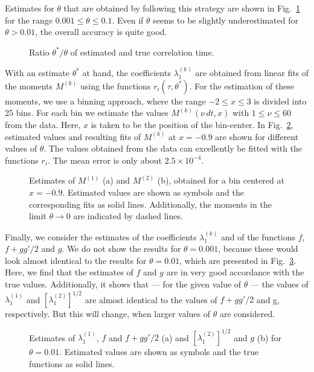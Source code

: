 \documentclass[aps,twocolumn,superscriptaddress,showpacs,showkeys]{revtex4}
\begin{document}
Estimates for $\theta$ that are obtained by following this strategy are shown in Fig.~\ref{fig3} for the range
$0.001\le\theta\le 0.1$. Even if $\theta$ seems to be slightly underestimated for $\theta>0.01$, the overall accuracy
is quite good.
%
\begin{figure}[h]
  \caption{\protect Ratio $\theta^*/\theta$ of estimated and true correlation time.
  }\label{fig3}
\end{figure}

With an estimate $\theta^*$ at hand, the coefficients $\lambda_1^{(k)}$ are obtained from linear fits
of the moments $M^{(k)}$ using the functions $r_i(\tau,\theta^*)$. For the estimation of these moments, we use a binning
approach, where the range $-2\le x\le 3$ is divided into 25 bins. For each bin we estimate the values $M^{(k)}(\nu\, dt,x)$
with $1\le\nu\le 60$ from the data. Here, $x$ is taken to be the position of the bin-center. In Fig.~\ref{fig4}, estimated
values and resulting fits of $M^{(k)}$ at $x=-0.9$ are shown for different values of $\theta$. The values obtained from
the data can excellently be fitted with the functions $r_i$. The mean error is only about $2.5\times 10^{-4}$.
%
\begin{figure}[h]
  \caption{\protect Estimates of $M^{(1)}$ (a) and $M^{(2)}$ (b), obtained for a bin centered at $x=-0.9$. Estimated 
           values are shown as symbols and the corresponding fits as solid lines. Additionally, the moments in the limit
           $\theta\to 0$ are indicated by dashed lines.
  }\label{fig4}
\end{figure}

Finally, we consider the estimates of the coefficients $\lambda_1^{(k)}$ and of the functions $f$, $f+gg'/2$ and
$g$. We do not show the results for $\theta=0.001$, because these would look almost identical to the results for
$\theta=0.01$, which are presented in Fig.~\ref{fig5}. Here, we find that the estimates of $f$ and $g$ are in very good
accordance with the true values. Additionally, it shows that --- for the given value of $\theta$ --- the values of
$\lambda_1^{(1)}$ and $[\lambda_1^{(2)}]^{1/2}$ are almost identical to the values of $f+gg'/2$ and g, respectively.
But this will change, when larger values of $\theta$ are considered.
%
\begin{figure}[H]
  \caption{\protect Estimates of $\lambda_1^{(1)}$, $f$ and $f+gg'/2$ (a) and $[\lambda_1^{(2)}]^{1/2}$ and $g$ (b)
           for $\theta=0.01$. Estimated values are shown as symbols and the true functions as solid lines.
  }\label{fig5}
\end{figure}
\end{document}
